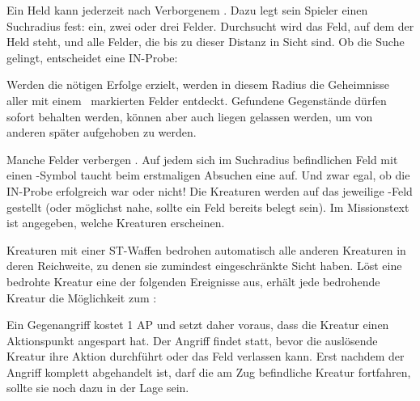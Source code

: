 {		
			Ein Held kann jederzeit nach Verborgenem . Dazu legt sein Spieler einen Suchradius fest: ein, zwei oder drei Felder. Durchsucht wird das Feld, auf dem der Held steht, und alle Felder, die bis zu dieser Distanz in Sicht sind. Ob die Suche gelingt, entscheidet eine IN-Probe:


			\noindent
			Werden die nötigen Erfolge erzielt, werden in diesem Radius die Geheimnisse aller mit einem \search~markierten Felder entdeckt. Gefundene Gegenstände dürfen sofort behalten werden, können aber auch liegen gelassen werden, um von anderen später aufgehoben zu werden.

			Manche Felder verbergen . Auf jedem sich im Suchradius befindlichen Feld mit einen \monster-Symbol taucht beim erstmaligen Absuchen eine auf. Und zwar egal, ob die IN-Probe erfolgreich war oder nicht! Die Kreaturen werden auf das jeweilige \monster-Feld gestellt (oder möglichst nahe, sollte ein Feld bereits belegt sein). Im Missionstext ist angegeben, welche Kreaturen erscheinen.

		Kreaturen mit einer ST-Waffen bedrohen automatisch alle anderen Kreaturen in deren Reichweite, zu denen sie zumindest eingeschränkte Sicht haben. Löst eine bedrohte Kreatur eine der folgenden Ereignisse aus, erhält jede bedrohende Kreatur die Möglichkeit zum :


		\noindent
		Ein Gegenangriff kostet 1 AP und setzt daher voraus, dass die Kreatur einen Aktionspunkt angespart hat. Der Angriff findet statt, bevor die auslösende Kreatur ihre Aktion durchführt oder das Feld verlassen kann. Erst nachdem der Angriff komplett abgehandelt ist, darf die am Zug befindliche Kreatur fortfahren, sollte sie noch dazu in der Lage sein.

}
